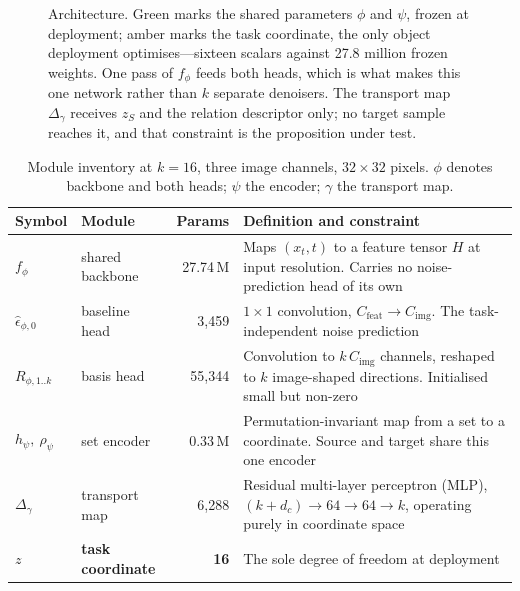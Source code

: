 \documentclass[11pt]{article}
\newcommand{\epshat}{\hat{\epsilon}}
\newcommand{\zS}{z_{S}}
\begin{document}
\begin{figure}[htbp]
{}


\caption{Architecture. Green marks the shared parameters $\phi$ and $\psi$, frozen at deployment;
amber marks the task coordinate, the only object deployment optimises---sixteen scalars against
27.8 million frozen weights. One pass of $f_\phi$ feeds both heads, which is what makes this one
network rather than $k$ separate denoisers. The transport map $\Delta_\gamma$ receives $\zS$ and
the relation descriptor only; no target sample reaches it, and that constraint is the proposition
under test.}
\label{fig:arch-u}
\end{figure}

\begin{table}[htbp]
\centering\small
\begin{tabular}{@{}llr p{7.0cm}@{}}
\toprule
\textbf{Symbol} & \textbf{Module} & \textbf{Params} & \textbf{Definition and constraint} \\
\midrule
$f_\phi$ & shared backbone & 27.74\,M
  & Maps $(x_t,t)$ to a feature tensor $H$ at input resolution. Carries no
    noise-prediction head of its own \\[2pt]
$\epshat_{\phi,0}$ & baseline head & 3{,}459
  & $1\times1$ convolution, $C_{\text{feat}}\!\to\!C_{\text{img}}$. The task-independent
    noise prediction \\[2pt]
$R_{\phi,1..k}$ & basis head & 55{,}344
  & Convolution to $k\,C_{\text{img}}$ channels, reshaped to $k$ image-shaped directions.
    Initialised small but non-zero \\[2pt]
$h_\psi,\ \rho_\psi$ & set encoder & 0.33\,M
  & Permutation-invariant map from a set to a coordinate. Source and target share this
    one encoder \\[2pt]
$\Delta_\gamma$ & transport map & 6{,}288
  & Residual multi-layer perceptron (MLP), $(k+d_c)\!\to\!64\!\to\!64\!\to\!k$, operating
    purely in coordinate space \\[2pt]
$z$ & \textbf{task coordinate} & \textbf{16}
  & The sole degree of freedom at deployment \\
\bottomrule
\end{tabular}
\caption{Module inventory at $k=16$, three image channels, $32\times32$ pixels. $\phi$ denotes
backbone and both heads; $\psi$ the encoder; $\gamma$ the transport map.}
\end{table}
\end{document}
